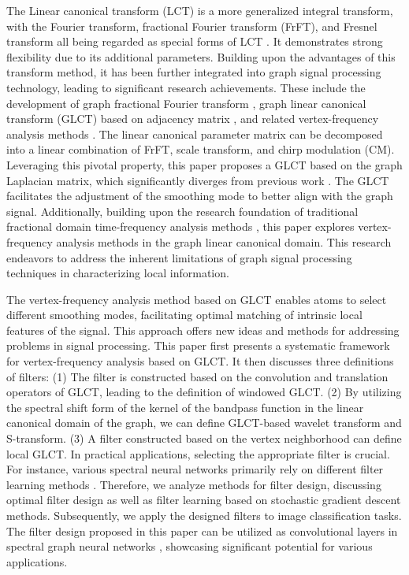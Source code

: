 \documentclass[lettersize,journal]{IEEEtran}
\begin{document}
The Linear canonical transform (LCT) is a more generalized integral transform, with the Fourier transform, fractional Fourier transform (FrFT), and Fresnel transform all being regarded as special forms of LCT \cite{pei2002, Healy2016, Pei2001}. It demonstrates strong flexibility due to its additional parameters. Building upon the advantages of this transform method, it has been further integrated into graph signal processing technology, leading to significant research achievements. These include the development of graph fractional Fourier transform \cite{wang2017fractional}, graph linear canonical transform (GLCT) \cite{zhang2023discrete} based on adjacency matrix , and related vertex-frequency analysis methods \cite{wu2020fractional, yan2021windowed}.
The linear canonical parameter matrix can be decomposed into a linear combination of FrFT, scale transform, and chirp modulation (CM). Leveraging this pivotal property, this paper proposes a GLCT based on the graph Laplacian matrix, which significantly diverges from previous work \cite{zhang2023discrete}. The GLCT facilitates the adjustment of the smoothing mode to better align with the graph signal. Additionally, building upon the research foundation of traditional fractional domain time-frequency analysis methods \cite{brown2009general,wei2022linear,wei2014generalized,kou2012windowed}, this paper explores vertex-frequency analysis methods in the graph linear canonical domain. This research endeavors to address the inherent limitations of graph signal processing techniques in characterizing local information.

The vertex-frequency analysis method based on GLCT enables atoms to select different smoothing modes, facilitating optimal matching of intrinsic local features of the signal. This approach offers new ideas and methods for addressing problems in signal processing. 
This paper first presents a systematic framework for vertex-frequency analysis based on GLCT. It then discusses three definitions of filters:
(1) The filter is constructed based on the convolution and translation operators of GLCT, leading to the definition of windowed GLCT.
(2) By utilizing the spectral shift form of the kernel of the bandpass function in the linear canonical domain of the graph, we can define GLCT-based wavelet transform and S-transform.
(3) A filter constructed based on the vertex neighborhood can define local GLCT.
In practical applications, selecting the appropriate filter is crucial. For instance, various spectral neural networks primarily rely on different filter learning methods \cite{chen2020understanding, bo2023survey, wang2022powerful, ozturk2021optimal}. 
Therefore, we analyze methods for filter design, discussing optimal filter design as well as filter learning based on stochastic gradient descent methods. Subsequently, we apply the designed filters to image classification tasks. The filter design proposed in this paper can be utilized as convolutional layers in spectral graph neural networks \cite{defferrard2016convolutional, chien2020adaptive, bruna2013spectral, liao2019lanczosnet}, showcasing significant potential for various applications.
\end{document}
